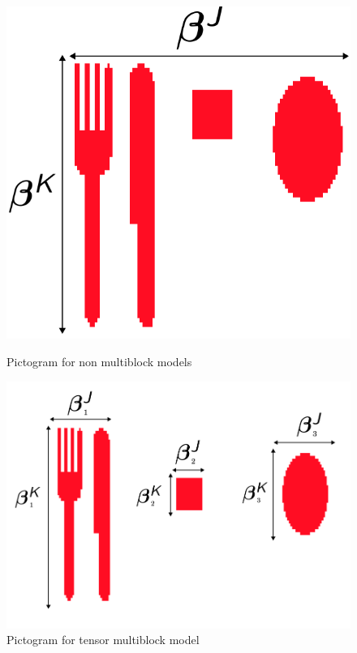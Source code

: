 \documentclass{beamer}
\begin{document}
\begin{frame}
    \begin{figure}
        \centering
        \begin{minipage}{0.45\textwidth}
            \centering
            \includegraphics[scale = 0.17]{images/3_picto.png}
            \caption{Pictogram for non multiblock models}
        \end{minipage}
        \begin{minipage}{0.45\textwidth}
            \centering
        \includegraphics[scale = 0.17]{images/3_picto_sepa.png}
        \caption{Pictogram for tensor multiblock model}
    \end{minipage}
    \end{figure}

\end{frame}
\end{document}
